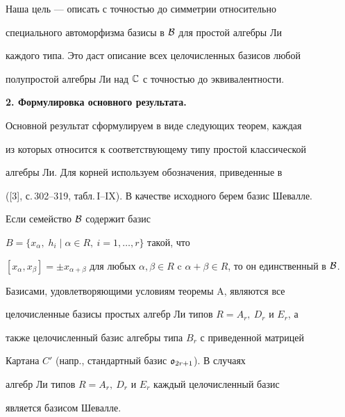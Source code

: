 Наша цель --- описать с точностью до симметрии относительно


специального автоморфизма базисы в $\cal B$ для простой алгебры Ли


каждого типа. Это даст описание всех целочисленных базисов любой


полупростой алгебры Ли над $\Bbb C$ с точностью до эквивалентности.


\medskip





{\bf 2. Формулировка основного результата.}


Основной результат сформулируем в виде следующих теорем, каждая


из которых относится к соответствующему типу простой классической


алгебры Ли. Для корней используем обозначения, приведенные в


([3], с.\,302--319, табл.\,I--IX). В качестве исходного берем базис Шевалле.





\begin{athm}


Если семейство $\cal B$ содержит базис


$B=\{x_\alpha,\;h_i\mid \alpha\in R,\ i=1,\dotsc,r\}$ такой, что


$[x_\alpha,x_\beta]=\pm x_{\alpha+\beta}$ для любых $\alpha,\beta\in


R$ c $\alpha+\beta\in R$, то он единственный в $\cal B$.


\end{athm}





Базисами, удовлетворяющими условиям теоремы A, являются все


целочисленные базисы простых алгебр Ли типов $R=A_r,\ D_r$ и $E_r$, а


также целочисленный базис алгебры типа $B_r$ с приведенной матрицей


Картана $C'$ (напр., стандартный базис $\frak o_{2r+1}$). В случаях


алгебр Ли типов $R=A_r,\ D_r$ и $E_r$ каждый целочисленный базис


является базисом Шевалле.








